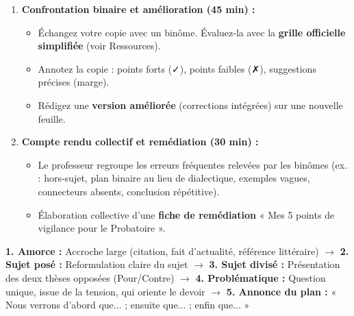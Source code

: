 \documentclass[11pt]{article}
\newcounter{popsec}
\newcounter{popsub}
\newcommand{\courssub}[1]{%
  \stepcounter{popsub}%
  \par\vspace{9pt}\noindent{\popxbold\fontsize{11.5}{13}\selectfont\color{popink}{\color{poporange}\thepopsec.\thepopsub}\hspace{6pt}#1}\par\nopagebreak\vspace{4pt}
}
\begin{document}
\begin{enumerate}
\begin{itemize}
        \item Rédigez les trois parties en paragraphes distincts (un paragraphe par sous-partie/argument).
        \item Respectez la structure du paragraphe argumentatif : \textbf{Idée directrice} (en tête) $\rightarrow$ \textbf{Explication/Argumentation} $\rightarrow$ \textbf{Exemple/Illustration} (dossier) $\rightarrow$ \textbf{Mini-bilan/Transition}.
        \item Soignez la cohésion (connecteurs, champs lexicaux, référents).
    \end{itemize}
    \item \textbf{Confrontation binaire et amélioration (45 min) :} 
    \begin{itemize}
        \item Échangez votre copie avec un binôme. Évaluez-la avec la \textbf{grille officielle simplifiée} (voir Ressources).
        \item Annotez la copie : points forts (✓), points faibles (✗), suggestions précises (marge).
        \item Rédigez une \textbf{version améliorée} (corrections intégrées) sur une nouvelle feuille.
    \end{itemize}
    \item \textbf{Compte rendu collectif et remédiation (30 min) :} 
    \begin{itemize}
        \item Le professeur regroupe les erreurs fréquentes relevées par les binômes (ex. : hors-sujet, plan binaire au lieu de dialectique, exemples vagues, connecteurs absents, conclusion répétitive).
        \item Élaboration collective d'une \textbf{fiche de remédiation} « Mes 5 points de vigilance pour le Probatoire ».
    \end{itemize}
\end{enumerate}

\courssub{Ressources à mobiliser}
\begin{definition}
\textbf{1. Amorce :} Accroche large (citation, fait d'actualité, référence littéraire) $\rightarrow$ \textbf{2. Sujet posé :} Reformulation claire du sujet $\rightarrow$ \textbf{3. Sujet divisé :} Présentation des deux thèses opposées (Pour/Contre) $\rightarrow$ \textbf{4. Problématique :} Question unique, issue de la tension, qui oriente le devoir $\rightarrow$ \textbf{5. Annonce du plan :} « Nous verrons d'abord que... ; ensuite que... ; enfin que... »
\end{definition}
\end{document}
